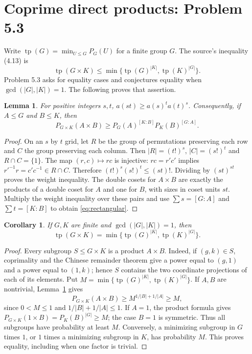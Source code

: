 \documentclass[11pt]{article}
\newtheorem{lemma}[theorem]{Lemma}
\newtheorem{corollary}[theorem]{Corollary}
\newcommand{\PP}{P}
\begin{document}
\section{Coprime direct products: Problem 5.3}
Write $\operatorname{tp}(G)=\min_{U\leq G}\PP_G(U)$ for a finite group $G$.
The source's inequality (4.13) is
\[
 \operatorname{tp}(G\times K)\leq
 \min\{\operatorname{tp}(G)^{|K|},\operatorname{tp}(K)^{|G|}\}.
\]
Problem 5.3 asks for equality cases and conjectures equality when
$\gcd(|G|,|K|)=1$. The following proves that assertion.

\begin{lemma}\label{lem:grid}
For positive integers $s,t$, $a(st)\geq a(s)^t a(t)^s$. Consequently,
if $A\leq G$ and $B\leq K$, then
\begin{equation}\label{eq:rectangular}
 \PP_{G\times K}(A\times B)\geq
 \PP_G(A)^{[K:B]}\PP_K(B)^{[G:A]}.
\end{equation}
\end{lemma}
\begin{proof}
On an $s$ by $t$ grid, let $R$ be the group of permutations preserving each
row and $C$ the group preserving each column. Then $|R|=(t!)^s$,
$|C|=(s!)^t$ and $R\cap C=\{1\}$. The map $(r,c)\mapsto rc$ is injective:
$rc=r'c'$ implies $r'^{-1}r=c'c^{-1}\in R\cap C$. Therefore
$(t!)^s(s!)^t\leq(st)!$. Dividing by $(st)^{st}$ proves the weight inequality.
The double cosets for $A\times B$ are exactly the products of a double coset
for $A$ and one for $B$, with sizes in coset units $st$.
Multiply the weight inequality over these pairs and use
$\sum s=[G:A]$ and $\sum t=[K:B]$ to obtain \eqref{eq:rectangular}.
\end{proof}

\begin{corollary}\label{cor:coprime}
If $G,K$ are finite and $\gcd(|G|,|K|)=1$, then
\[
 \operatorname{tp}(G\times K)=
 \min\{\operatorname{tp}(G)^{|K|},\operatorname{tp}(K)^{|G|}\}.
\]
\end{corollary}
\begin{proof}
Every subgroup $S\leq G\times K$ is a product $A\times B$. Indeed, if
$(g,k)\in S$, coprimality and the Chinese remainder theorem give a power
equal to $(g,1)$ and a power equal to $(1,k)$; hence $S$ contains the
two coordinate projections of each of its elements.
Put $M=\min\{\operatorname{tp}(G)^{|K|},\operatorname{tp}(K)^{|G|}\}$.
If $A,B$ are nontrivial, Lemma~\ref{lem:grid} gives
\[
 \PP_{G\times K}(A\times B)
 \geq M^{1/|B|+1/|A|}\geq M,
\]
since $0<M\leq1$ and $1/|B|+1/|A|\leq1$.
If $A=1$, the product formula gives
$\PP_{G\times K}(1\times B)=\PP_K(B)^{|G|}\geq M$;
the case $B=1$ is symmetric. Thus all subgroups have probability at least $M$.
Conversely, a minimizing subgroup in $G$ times $1$, or $1$ times a
minimizing subgroup in $K$, has probability $M$. This proves equality,
including when one factor is trivial.
\end{proof}
\end{document}
